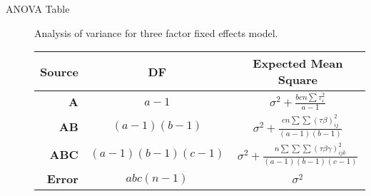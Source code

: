 \documentclass[10pt,landscape]{article}
\begin{document}
\begin{multicols}{3}
    \begin{description}
    \item[ANOVA Table] Analysis of variance for three factor fixed effects model. \\
        \begin{center}
            \begin{tabular}{r|cc}
                \textbf{Source}  & \textbf{DF} & \textbf{Expected Mean Square}  \\ \hline
                \textbf{A} & $a-1$ & $\sigma^2+\frac{bcn\sum\tau_i^2}{a-1}$ \\
                \textbf{AB} & $(a-1)(b-1)$ & $\sigma^2+\frac{cn\sum\sum(\tau\beta)_{ij}^2}{(a-1)(b-1)}$ \\
                \textbf{ABC} & $(a-1)(b-1)(c-1)$ & $\sigma^2+\frac{n\sum\sum\sum(\tau\beta\gamma)_{ijk}^2}{(a-1)(b-1)(c-1)}$ \\
                \textbf{Error} & $abc(n-1)$ & $\sigma^2$ \\
            \end{tabular}
        \end{center}
    
\end{description}



\end{multicols}
\end{document}
